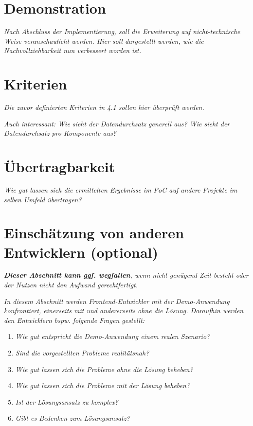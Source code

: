 
\section{Demonstration}

	\textit{Nach Abschluss der Implementierung, soll die Erweiterung auf nicht-technische Weise veranschaulicht werden. Hier soll dargestellt werden, wie die Nachvollziehbarkeit nun verbessert worden ist.}
	
\section{Kriterien}

	\textit{Die zuvor definierten Kriterien in 4.1 sollen hier überprüft werden.}

	\textit{Auch interessant: Wie sieht der Datendurchsatz generell aus? Wie sieht der Datendurchsatz pro Komponente aus?}
	
\section{Übertragbarkeit}

	\textit{Wie gut lassen sich die ermittelten Ergebnisse im PoC auf andere Projekte im selben Umfeld übertragen?}
	
\section{Einschätzung von anderen Entwicklern (optional)}

	\textit{\textbf{Dieser Abschnitt kann ggf. wegfallen}, wenn nicht genügend Zeit besteht oder der Nutzen nicht den Aufwand gerechtfertigt.}
	
	\textit{In diesem Abschnitt werden Frontend-Entwickler mit der Demo-Anwendung konfrontiert, einerseits mit und andererseits ohne die Lösung. Daraufhin werden den Entwicklern bspw. folgende Fragen gestellt:}
	
	\begin{enumerate}
		\item \textit{Wie gut entspricht die Demo-Anwendung einem realen Szenario?}
		\item \textit{Sind die vorgestellten Probleme realitätsnah?}
		\item \textit{Wie gut lassen sich die Probleme ohne die Lösung beheben?}
		\item \textit{Wie gut lassen sich die Probleme mit der Lösung beheben?}
		\item \textit{Ist der Lösungsansatz zu komplex?}
		\item \textit{Gibt es Bedenken zum Lösungsansatz?}
	\end{enumerate}